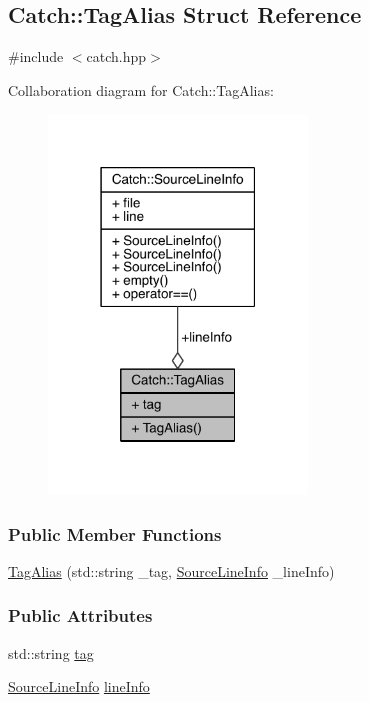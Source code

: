 \hypertarget{a00084}{}\subsection{Catch\+:\+:Tag\+Alias Struct Reference}
\label{a00084}


{\ttfamily \#include $<$catch.\+hpp$>$}



Collaboration diagram for Catch\+:\+:Tag\+Alias\+:\nopagebreak
\begin{figure}[H]
\begin{center}
\leavevmode
\includegraphics[width=195pt]{a00281}
\end{center}
\end{figure}
\subsubsection*{Public Member Functions}
\begin{DoxyCompactItemize}
\item 
\hyperlink{a00084_ad9124d03bfb6f767f1c97572330b05bc}{Tag\+Alias} (std\+::string \+\_\+tag, \hyperlink{a00075}{Source\+Line\+Info} \+\_\+line\+Info)
\end{DoxyCompactItemize}
\subsubsection*{Public Attributes}
\begin{DoxyCompactItemize}
\item 
std\+::string \hyperlink{a00084_a950183883ab17c90d0fab16b966b6e2d}{tag}
\item 
\hyperlink{a00075}{Source\+Line\+Info} \hyperlink{a00084_a2f51fe0b3c052561275d26b6eb88f702}{line\+Info}
\end{DoxyCompactItemize}


